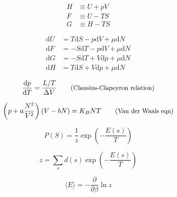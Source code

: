 \begin{align*}
    H &\equiv  U + pV \\
    F &\equiv U - TS \\
    G &\equiv H - TS
\end{align*}

\begin{figure}
    \centering
\end{figure}

\begin{align}
    \mathrm{d}U &= T\mathrm{d}S - p\mathrm{d}V + \mu \mathrm{d}N \\
    \mathrm{d}F &= -S\mathrm{d}T - p\mathrm{d}V + \mu \mathrm{d}N \\
    \mathrm{d}G &= -S\mathrm{d}T + V\mathrm{d}p + \mu \mathrm{d}N \\
    \mathrm{d}H &= T\mathrm{d}S + V\mathrm{d}p + \mu \mathrm{d}N
\end{align}



\begin{equation*}
    \d{p}{T} = \frac{L/T}{\Delta V} \comment{Clausius-Clapeyron relation}
\end{equation*}

\begin{equation*}
    \left(p + a\frac{N^2}{V^{2}}\right) \left(V - bN\right) = K_{B}NT \comment{Van der Waals eqn}
\end{equation*}

\begin{equation*}
    P(S) = \frac{1}{z} \exp \left(- \frac{E(s)}{T} \right)
\end{equation*}

\begin{equation*}
    z = \sum_{s} d(s) \exp \left(- \frac{E(s)}{T} \right)
\end{equation*}

\begin{equation*}
    \langle E \rangle = -\frac{\partial}{\partial \beta} \ln z
\end{equation*}

